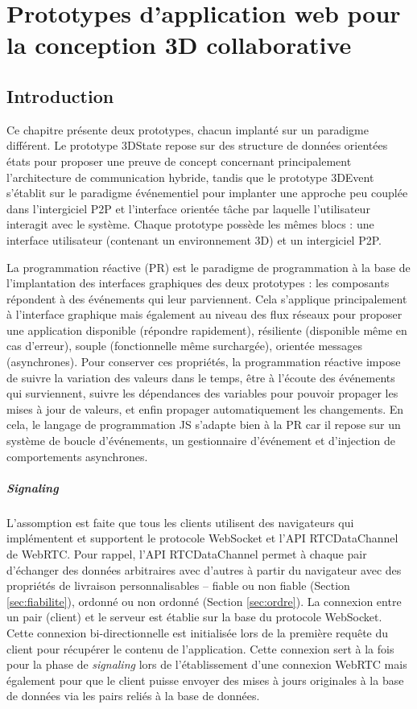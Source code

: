 \chapter{Prototypes d'application web pour la conception 3D collaborative}
\label{sec:chap:proto}
\chaptertable

\section{Introduction}
Ce chapitre présente deux prototypes, chacun implanté sur un paradigme différent.
Le prototype 3DState repose sur des structure de données orientées états pour 
proposer une preuve de concept concernant principalement l'architecture de 
communication hybride, tandis que le prototype 3DEvent s'établit sur le paradigme 
événementiel pour implanter une approche peu couplée dans l'intergiciel \gls{P2P} 
et l'interface orientée tâche par laquelle l'utilisateur interagit avec le système.
Chaque prototype possède les mêmes blocs : une interface utilisateur (contenant 
un environnement 3D) et un intergiciel \gls{P2P}.


La programmation réactive (PR) est le paradigme de programmation à la base de 
l'implantation des interfaces graphiques des deux prototypes : les composants 
répondent à des événements qui leur parviennent. 
Cela s'applique principalement à l'interface graphique mais 
également au niveau des flux réseaux pour proposer une application disponible 
(répondre rapidement), résiliente (disponible même en cas d'erreur), souple 
(fonctionnelle même surchargée), orientée messages (asynchrones). Pour 
conserver ces propriétés, la programmation réactive impose 
de suivre la variation des valeurs dans le temps, être à l'écoute des événements 
qui surviennent, suivre les dépendances des variables pour pouvoir propager les 
mises à jour de valeurs, et enfin propager automatiquement les changements.
En cela, le langage de programmation \gls{JS} s'adapte bien à la PR car il repose 
sur un système de boucle d'événements, un gestionnaire d'événement et 
d'injection de comportements asynchrones. 

\paragraph{Signaling}
L'assomption est faite que tous les clients utilisent des navigateurs qui 
implémentent et supportent le protocole WebSocket et l'\gls{API} 
RTCDataChannel de WebRTC. Pour rappel, l'\gls{API} RTCDataChannel permet à 
chaque pair d'échanger des données arbitraires 
avec d'autres à partir du navigateur avec des propriétés de livraison 
personnalisables -- fiable ou non fiable (Section \ref{sec:fiabilite}), ordonné ou non 
ordonné (Section \ref{sec:ordre}). 
La connexion entre un pair (client) et le serveur est établie sur la base du protocole 
\gls{WebSocket}. Cette connexion bi-directionnelle est initialisée lors de la 
première requête du client pour récupérer le contenu de l'application. Cette 
connexion sert à la fois pour la phase de \textit{signaling} lors de l'établissement 
d'une connexion \gls{WebRTC} mais également pour que le client puisse envoyer 
des mises à jours originales à la base de données via les pairs reliés à la base de 
données. 


